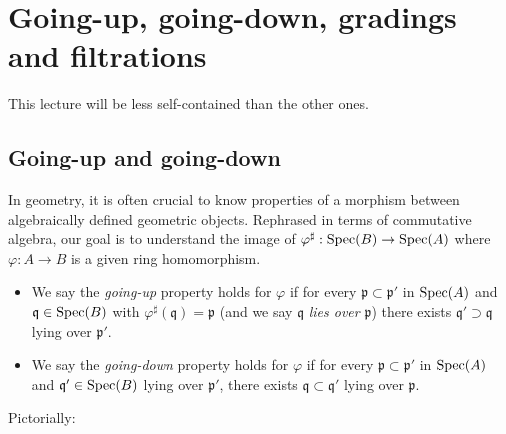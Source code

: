 
\chapter{Going-up, going-down, gradings and filtrations}

This lecture will be less self-contained than the other ones.

\section{Going-up and going-down}
In geometry, it is often crucial to know properties of a morphism between algebraically defined geometric objects. Rephrased in terms of commutative algebra, our goal is to understand the image of $\varphi^\sharp: \operatorname{Spec}(B) \to \operatorname{Spec}(A)$ where $\varphi: A \to B$ is a given ring homomorphism.

\begin{itemize}
	\item We say the \emph{going-up} property holds for $\varphi$ if for every $\mathfrak{p} \subset \mathfrak{p}'$ in $\operatorname{Spec}(A)$ and $\mathfrak{q} \in \operatorname{Spec}(B)$ with $\varphi^\sharp(\mathfrak{q}) = \mathfrak{p}$ (and we say $\mathfrak{q}$ \emph{lies over} $\mathfrak{p}$) there exists $\mathfrak{q}' \supset \mathfrak{q}$ lying over $\mathfrak{p}'$. 
	\item We say the \emph{going-down} property holds for $\varphi$ if for every $\mathfrak{p} \subset \mathfrak{p}'$ in $\operatorname{Spec}(A)$ and $\mathfrak{q}' \in \operatorname{Spec}(B)$ lying over $\mathfrak{p}'$, there exists $\mathfrak{q} \subset \mathfrak{q}'$ lying over $\mathfrak{p}$. 
\end{itemize}
Pictorially:
\begin{center}\end{center}

